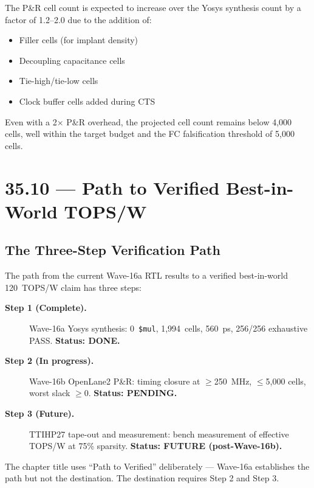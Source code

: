 The P\&R cell count is expected to increase over the Yosys synthesis count
by a factor of 1.2--2.0 due to the addition of:
\begin{itemize}
  \item Filler cells (for implant density)
  \item Decoupling capacitance cells
  \item Tie-high/tie-low cells
  \item Clock buffer cells added during CTS
\end{itemize}

Even with a 2\(\times\) P\&R overhead, the projected cell count remains
below 4,000 cells, well within the target budget and the FC falsification
threshold of 5,000 cells.

\section{35.10 --- Path to Verified Best-in-World TOPS/W}
\label{sec:glava35-path}

\subsection{The Three-Step Verification Path}

The path from the current Wave-16a RTL results to a verified best-in-world
120~TOPS/W claim has three steps:

\begin{description}
  \item[\textbf{Step 1 (Complete).}] Wave-16a Yosys synthesis:
        0~\texttt{\$mul}, 1,994~cells, 560~ps, 256/256 exhaustive PASS.
        \textbf{Status: DONE.}
  \item[\textbf{Step 2 (In progress).}] Wave-16b OpenLane2 P\&R:
        timing closure at $\geq$250~MHz, $\leq$5,000 cells, worst slack $\geq 0$.
        \textbf{Status: PENDING.}
  \item[\textbf{Step 3 (Future).}] TTIHP27 tape-out and measurement:
        bench measurement of effective TOPS/W at 75\% sparsity.
        \textbf{Status: FUTURE (post-Wave-16b).}
\end{description}

The chapter title uses ``Path to Verified'' deliberately --- Wave-16a
establishes the path but not the destination.
The destination requires Step 2 and Step 3.

